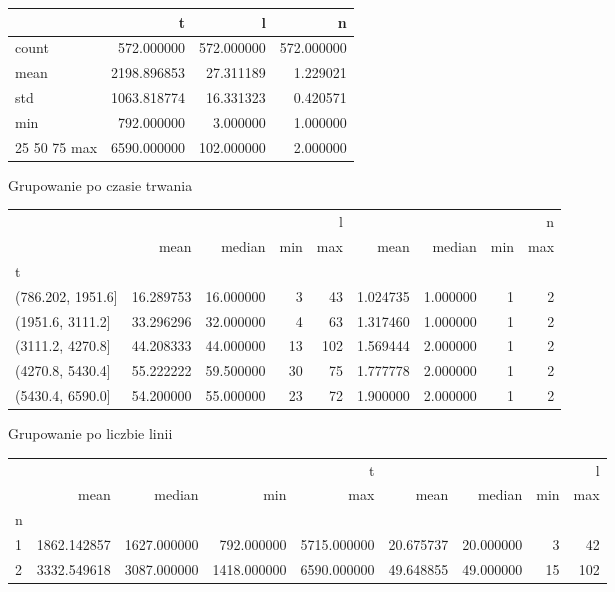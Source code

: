 \begin{tabular}{lrrr}
\toprule
 & t & l & n \\
\midrule
count & 572.000000 & 572.000000 & 572.000000 \\
mean & 2198.896853 & 27.311189 & 1.229021 \\
std & 1063.818774 & 16.331323 & 0.420571 \\
min & 792.000000 & 3.000000 & 1.000000 \\
25%
50%
75%
max & 6590.000000 & 102.000000 & 2.000000 \\
\bottomrule
\end{tabular}


 Grupowanie po czasie trwania
\begin{tabular}{lrrrrrrrr}
\toprule
 & \multicolumn{4}{r}{l} & \multicolumn{4}{r}{n} \\
 & mean & median & min & max & mean & median & min & max \\
t &  &  &  &  &  &  &  &  \\
\midrule
(786.202, 1951.6] & 16.289753 & 16.000000 & 3 & 43 & 1.024735 & 1.000000 & 1 & 2 \\
(1951.6, 3111.2] & 33.296296 & 32.000000 & 4 & 63 & 1.317460 & 1.000000 & 1 & 2 \\
(3111.2, 4270.8] & 44.208333 & 44.000000 & 13 & 102 & 1.569444 & 2.000000 & 1 & 2 \\
(4270.8, 5430.4] & 55.222222 & 59.500000 & 30 & 75 & 1.777778 & 2.000000 & 1 & 2 \\
(5430.4, 6590.0] & 54.200000 & 55.000000 & 23 & 72 & 1.900000 & 2.000000 & 1 & 2 \\
\bottomrule
\end{tabular}


 Grupowanie po liczbie linii
\begin{tabular}{lrrrrrrrr}
\toprule
 & \multicolumn{4}{r}{t} & \multicolumn{4}{r}{l} \\
 & mean & median & min & max & mean & median & min & max \\
n &  &  &  &  &  &  &  &  \\
\midrule
1 & 1862.142857 & 1627.000000 & 792.000000 & 5715.000000 & 20.675737 & 20.000000 & 3 & 42 \\
2 & 3332.549618 & 3087.000000 & 1418.000000 & 6590.000000 & 49.648855 & 49.000000 & 15 & 102 \\
\bottomrule
\end{tabular}
